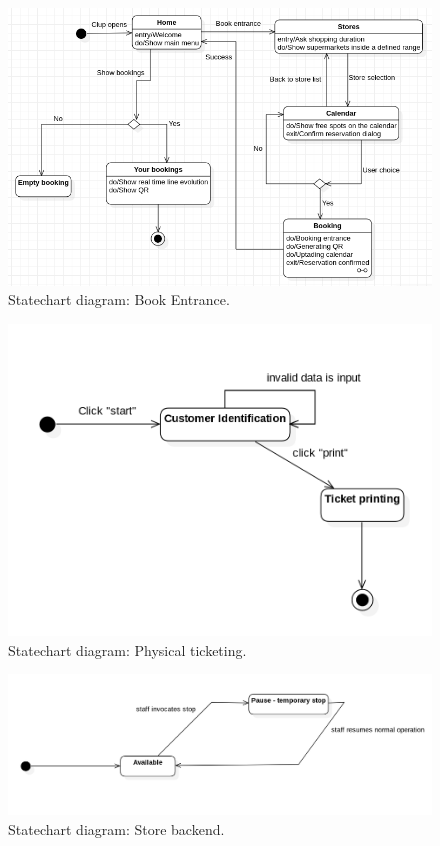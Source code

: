 \begin{figure}
	\includegraphics[width=\linewidth]{../Diagrams/BookEntrance.png}
	\caption{Statechart diagram: Book Entrance.}
	\label{fig:BookEntr}
\end{figure} 
\begin{figure}
	\includegraphics[width=\linewidth]{../Diagrams/PhysicalTicketing.png}
	\caption{Statechart diagram: Physical ticketing.}
	\label{fig:PhysTick}
\end{figure} 
\begin{figure}
	\includegraphics[width=\linewidth]{../Diagrams/StoreBackend.png}
	\caption{Statechart diagram: Store backend.}
	\label{fig:StoreBackE}
\end{figure} 

